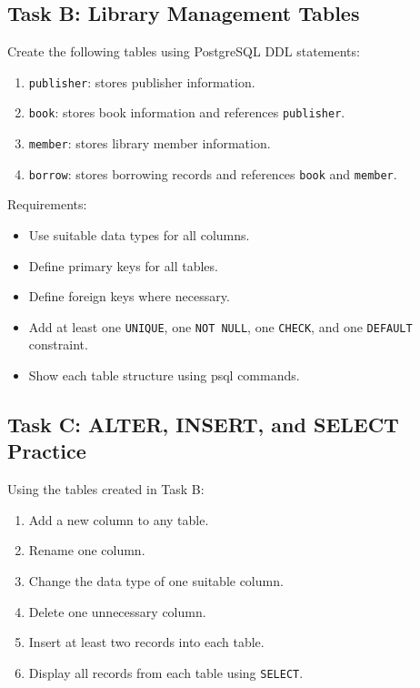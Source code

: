 \documentclass[12pt,a4paper]{article}
\newcommand{\screenshotplaceholder}[2]{%
  \begin{figure}[H]
      \centering
      \fbox{\parbox[c][#1][c]{0.9\linewidth}{\centering #2}}
  \end{figure}
}
\begin{document}

\subsection*{Task B: Library Management Tables}
Create the following tables using PostgreSQL DDL statements:
\begin{enumerate}
    \item \texttt{publisher}: stores publisher information.
    \item \texttt{book}: stores book information and references \texttt{publisher}.
    \item \texttt{member}: stores library member information.
    \item \texttt{borrow}: stores borrowing records and references \texttt{book} and \texttt{member}.
\end{enumerate}

\noindent Requirements:
\begin{itemize}
    \item Use suitable data types for all columns.
    \item Define primary keys for all tables.
    \item Define foreign keys where necessary.
    \item Add at least one \texttt{UNIQUE}, one \texttt{NOT NULL}, one \texttt{CHECK}, and one \texttt{DEFAULT} constraint.
    \item Show each table structure using psql commands.
\end{itemize}


\subsection*{Task C: ALTER, INSERT, and SELECT Practice}
Using the tables created in Task B:
\begin{enumerate}
    \item Add a new column to any table.
    \item Rename one column.
    \item Change the data type of one suitable column.
    \item Delete one unnecessary column.
    \item Insert at least two records into each table.
    \item Display all records from each table using \texttt{SELECT}.
\end{enumerate}
\end{document}

